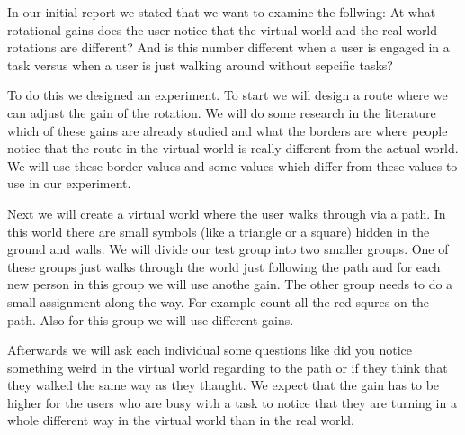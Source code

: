 In our initial report we stated that we want to examine the follwing:
At what rotational gains does the user notice that the virtual world and the real world rotations are different?
And is this number different when a user is engaged in a task versus when a user is just walking around without sepcific tasks?

To do this we designed an experiment.
To start we will design a route where we can adjust the gain of the rotation.
We will do some research in the literature which of these gains are already studied and what the borders are where people notice that the route in the virtual world is really different from the actual world.
We will use these border values and some values which differ from these values to use in our experiment.

Next we will create a virtual world where the user walks through via a path.
In this world there are small symbols (like a triangle or a square) hidden in the ground and walls.
We will divide our test group into two smaller groups.
One of these groups just walks through the world just following the path and for each new person in this group we will use anothe gain.
The other group needs to do a small assignment along the way. For example count all the red squres on the path.
Also for this group we will use different gains.

Afterwards we will ask each individual some questions like did you notice something weird in the virtual world regarding to the path or if they think that they walked the same way as they thaught.
We expect that the gain has to be higher for the users who are busy with a task to notice that they are turning in a whole different way in the virtual world than in the real world.
